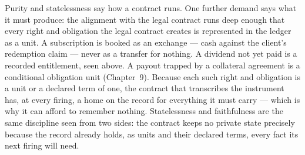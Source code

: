 Purity and statelessness say how a contract runs. One further demand says what it
must produce: the alignment with the legal contract runs deep enough that every
right and obligation the legal contract creates is represented in the ledger as
a unit. A subscription is booked as an exchange --- cash against the client's
redemption claim --- never as a transfer for nothing. A dividend not yet paid is
a recorded entitlement, seen above. A payout trapped by a collateral agreement
is a conditional obligation unit (Chapter~9). Because each such right and
obligation is a unit or a declared term of one, the contract that transcribes
the instrument has, at every firing, a home on the record for everything it must
carry --- which is why it can afford to remember nothing. Statelessness and
faithfulness are the same discipline seen from two sides: the contract keeps no
private state precisely because the record already holds, as units and their
declared terms, every fact its next firing will need.
